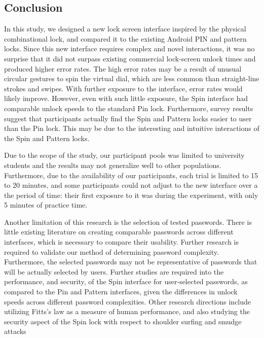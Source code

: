 \documentclass{sigchi}
\begin{document}
\subsection{Conclusion}
In this study, we designed a new lock screen interface inspired by the physical combinational lock, and compared it to the existing Android PIN and pattern locks. Since this new interface requires complex and novel interactions, it was no surprise that it did not surpass existing commercial lock-screen unlock times and produced higher error rates.  The high error rates may be a result of unusual circular gestures to spin the virtual dial, which are less common than straight-line strokes and swipes. With further exposure to the interface, error rates would likely improve. However, even with such little exposure, the Spin interface had comparable unlock speeds to the standard Pin lock. Furthermore, survey results suggest that participants actually find the Spin and Pattern locks easier to user than the Pin lock. This may be due to the interesting and intuitive interactions of the Spin and Pattern locks. 

Due to the scope of the study, our participant pools was limited to university students and the results may not generalize well to other populations. Furthermore, due to the availability of our participants, each trial is limited to 15 to 20 minutes, and some participants could not adjust to the new interface over a the period of time: their first exposure to it was during the experiment, with only 5 minutes of practice time. 

Another limitation of this research is the selection of tested passwords. There is little existing literature on creating comparable passwords across different interfaces, which is necessary to compare their usability. Further research is required to validate our method of determining password complexity. Furthermore, the selected passwords may not be representative of passwords that will be actually selected by users. Further studies are required into the performance, and security, of the Spin interface for user-selected passwords, as compared to the Pin and Pattern interfaces, given the differences in unlock speeds across different password complexities. Other research directions include utilizing Fitts's law as a measure of human performance, and also studying the security aspect of the Spin lock with respect to shoulder surfing  and smudge attacks
\end{document}
